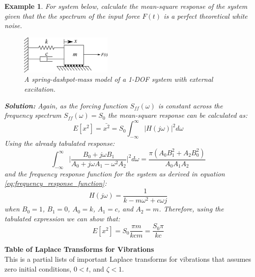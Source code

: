 \documentclass[12pt,letter]{article}
\newtheorem{ex}{Example}
\numberwithin{ex}{section} %
\newenvironment{example}{\begin{mdframed}[middlelinewidth=0.5mm]\begin{ex}\normalfont}{\end{ex}\end{mdframed}}
\numberwithin{re}{section} %
\begin{document}
\begin{example}
	For system below, calculate the mean-square response of the system given that the the spectrum of the input force $F(t)$ is a perfect theoretical white noise.
	\begin{figure}[H]
		\centering
		\includegraphics[width=0.4\textwidth]{../Figures/forced_spring_mass_damper_system.png}
		\caption{A spring-dashpot-mass model of a 1-DOF system with external excitation.}
	\end{figure}
	\noindent\textbf{Solution:} Again, as the forcing function $S_{ff}(\omega)$ is constant across the frequency spectrum $S_{ff}(\omega)=S_0$ the mean-square response can be calculated as:
	\begin{equation}
		E[x^2] = \bar{x^2} =   S_{0} \int_{-\infty}^{\infty} |H(j\omega)|^2 d\omega
	\end{equation}
	Using the already tabulated response:
	\begin{equation}
		\int_{-\infty}^{\infty} \bigg|\frac{B_0 + j \omega B_1}{A_0+j \omega A_1 - \omega^2 A_2} \bigg|^2 d\omega = \frac{\pi (A_0 B_1^2 + A_2 B_0^2)}{A_0 A_1 A_2}
	\end{equation} 
	and the frequency response function for the system as derived in equation \ref{eq:frequency_response_function}:
	\begin{equation}
		H(j\omega) = \frac{1}{k-m\omega^2+c\omega j}
	\end{equation}
	when $B_0=1$, $B_1 = 0$, $A_0=k$, $A_1=c$, and $A_2 =m$. Therefore, using the tabulated expression we can show that:
	\begin{equation}
		E[x^2] = S_0 \frac{\pi m }{k c m} =  \frac{S_0 \pi}{k c}
	\end{equation} 
\end{example}			
			
\pagebreak			
			\pagestyle{empty}
			\vspace{-25ex}
			\begin{center}
			{\large{}\textbf{Table of Laplace Transforms for Vibrations}} \\
			\normalsize{} This is a partial lists of important Laplace transforms for vibrations that assumes \\ zero initial conditions, $0 < t$, and $\zeta < 1$.
			\end{center}
			
\end{document}
